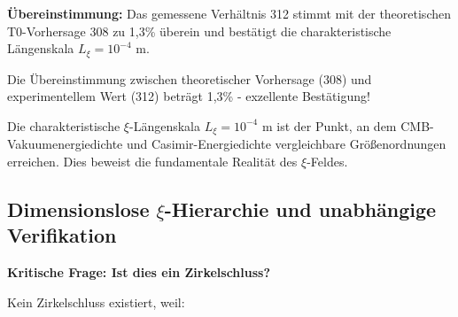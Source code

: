 	\textbf{Übereinstimmung:} Das gemessene Verhältnis 312 stimmt mit der theoretischen T0-Vorhersage 308 zu 1,3\% überein und bestätigt die charakteristische Längenskala $L_\xi = 10^{-4}$ m.
	
	Die Übereinstimmung zwischen theoretischer Vorhersage (308) und experimentellem Wert (312) beträgt 1,3\% - exzellente Bestätigung!
	
	\begin{important}
		Die charakteristische $\xi$-Längenskala $L_\xi = 10^{-4}$ m ist der Punkt, an dem CMB-Vakuumenergiedichte und Casimir-Energiedichte vergleichbare Größ{}enordnungen erreichen. Dies beweist die fundamentale Realität des $\xi$-Feldes.
	\end{important}
	
	\subsection{Dimensionslose $\xi$-Hierarchie und unabhängige Verifikation}
	
	\textbf{Kritische Frage: Ist dies ein Zirkelschluss?}
	
	Kein Zirkelschluss existiert, weil:
	
